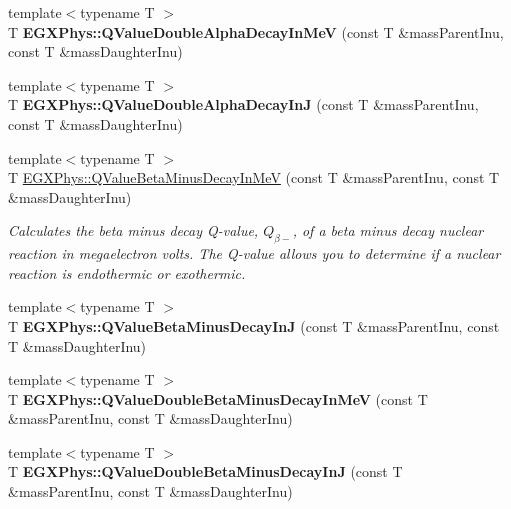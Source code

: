 \begin{DoxyCompactItemize}
{\footnotesize template$<$typename T $>$ }\\T {\bfseries E\+G\+X\+Phys\+::\+Q\+Value\+Double\+Alpha\+Decay\+In\+MeV} (const T \&mass\+Parent\+Inu, const T \&mass\+Daughter\+Inu)
\item 
\mbox{\label{group___q_value_gaefd0ecd4ae3166d18a4748ff540e6bfc}} 
{\footnotesize template$<$typename T $>$ }\\T {\bfseries E\+G\+X\+Phys\+::\+Q\+Value\+Double\+Alpha\+Decay\+InJ} (const T \&mass\+Parent\+Inu, const T \&mass\+Daughter\+Inu)
\item 
{\footnotesize template$<$typename T $>$ }\\T \hyperlink{group___q_value_ga42468e998cf58a027a676755aa1339ba}{E\+G\+X\+Phys\+::\+Q\+Value\+Beta\+Minus\+Decay\+In\+MeV} (const T \&mass\+Parent\+Inu, const T \&mass\+Daughter\+Inu)
\begin{DoxyCompactList}\small\item\em Calculates the beta minus decay Q-\/value, $Q_{\beta-}$, of a beta minus decay nuclear reaction in megaelectron volts. The Q-\/value allows you to determine if a nuclear reaction is endothermic or exothermic. \end{DoxyCompactList}\item 
\mbox{\label{group___q_value_ga4a2ab24ffb317abc97ce46c92bb64c3c}} 
{\footnotesize template$<$typename T $>$ }\\T {\bfseries E\+G\+X\+Phys\+::\+Q\+Value\+Beta\+Minus\+Decay\+InJ} (const T \&mass\+Parent\+Inu, const T \&mass\+Daughter\+Inu)
\item 
\mbox{\label{group___q_value_ga0eefdd84aa89d210e00dca043368dfeb}} 
{\footnotesize template$<$typename T $>$ }\\T {\bfseries E\+G\+X\+Phys\+::\+Q\+Value\+Double\+Beta\+Minus\+Decay\+In\+MeV} (const T \&mass\+Parent\+Inu, const T \&mass\+Daughter\+Inu)
\item 
\mbox{\label{group___q_value_gaf19d189152aec04d8b1ebbbe8792540b}} 
{\footnotesize template$<$typename T $>$ }\\T {\bfseries E\+G\+X\+Phys\+::\+Q\+Value\+Double\+Beta\+Minus\+Decay\+InJ} (const T \&mass\+Parent\+Inu, const T \&mass\+Daughter\+Inu)
\item 
\mbox{\label{group___q_value_ga9bf549cd4f8e1c76e9cc41b72d4f0279}} 

\end{DoxyCompactItemize}
